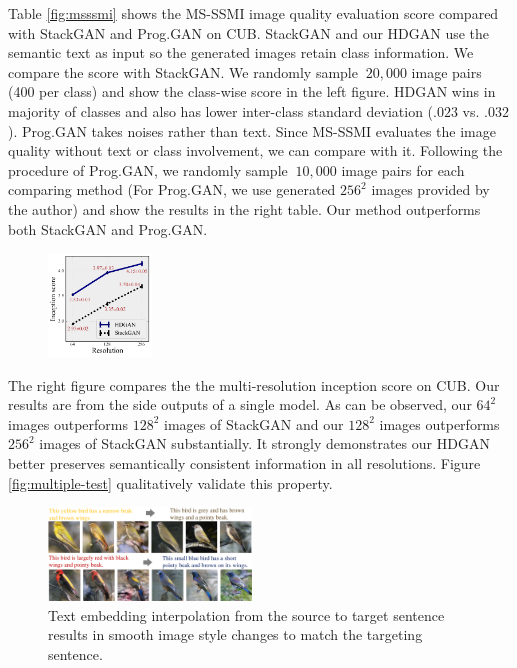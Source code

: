 \documentclass[10pt,twocolumn,letterpaper]{article}
\begin{document}
Table \ref{fig:msssmi} shows the MS-SSMI image quality evaluation score compared with StackGAN and Prog.GAN on CUB. StackGAN and our HDGAN use the semantic text as input so the generated images retain class information. We compare the score with StackGAN. We randomly sample ${~}20,000$ image pairs (400 per class) and show the class-wise score in the left figure. HDGAN wins in majority of classes and also has lower inter-class standard deviation ($.023$ vs. $.032$).
Prog.GAN takes noises rather than text. Since MS-SSMI evaluates the image quality without text or class involvement, we can compare with it. Following the procedure of Prog.GAN, we randomly sample ${~}10,000$ image pairs for each comparing method (For Prog.GAN, we use generated $256^2$ images provided by the author) and show the results in the right table. Our method outperforms both StackGAN and Prog.GAN. 


\begingroup
\setlength{\intextsep}{-4pt}%
\setlength{\columnsep}{0pt}%
\begin{figure}
	\centering
	\includegraphics[width=0.245\textwidth]{figure/multiscale_inception_2.pdf}
	\vspace{-12pt}
\end{figure}
The right figure compares the the multi-resolution inception score on CUB. Our results are from the side outputs of a single model. As can be observed, our $64^2$ images outperforms $128^2$ images of StackGAN and our $128^2$ images outperforms $256^2$ images of StackGAN substantially. It strongly demonstrates our HDGAN better preserves semantically consistent information in all resolutions. Figure \ref{fig:multiple-test} qualitatively validate this property.

\begin{figure}[t]
	\centering
	\includegraphics[width=0.48\textwidth]{figure/interp.pdf}
	\vspace{-.5cm}
	\caption{Text embedding interpolation from the source to target sentence results in smooth image style changes to match the targeting sentence. } \label{fig:interp}
	\vspace{-.3cm}
\end{figure}
\end{document}
